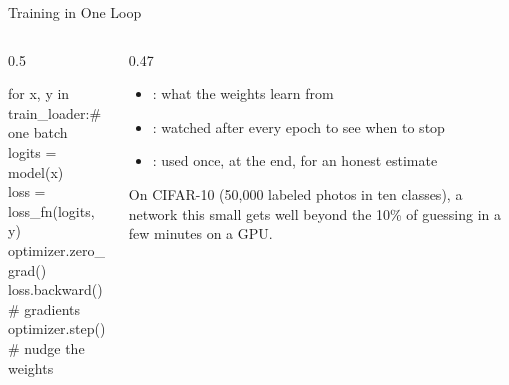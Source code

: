 \begin{frame}{Training in One Loop}
\begin{columns}[T]
\begin{column}{0.5\textwidth}
\begin{codebox}
for x, y in train\_loader:\hfill\textcolor{codegreen}{\# one batch}\\
\hspace*{1.5em}logits = model(x)\\
\hspace*{1.5em}loss = loss\_fn(logits, y)\\
\hspace*{1.5em}optimizer.zero\_grad()\\
\hspace*{1.5em}loss.backward()\hfill\textcolor{codegreen}{\# gradients}\\
\hspace*{1.5em}optimizer.step()\hfill\textcolor{codegreen}{\# nudge the weights}
\end{codebox}
\end{column}
\begin{column}{0.47\textwidth}
\begin{itemize}
\item {}: what the weights learn from
\item {}: watched after every epoch to see when to stop
\item {}: used once, at the end, for an honest estimate
\end{itemize}
\vspace{0.1cm}
\begin{graybox}
On CIFAR-10 (50,000 labeled photos in ten classes), a network this small gets well beyond the
10\% of guessing in a few minutes on a GPU.
\end{graybox}
\end{column}
\end{columns}
\end{frame}

